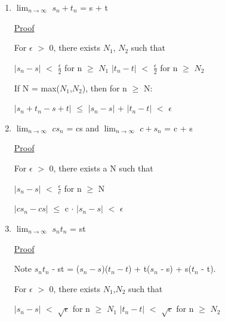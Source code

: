 	\begin{enumerate}[label=(\alph*), leftmargin=2cm, itemsep=0.1cm]
        \item $\lim_{n \rightarrow \infty}$ $s_n + t_n$ = s + t
        
            { \color{magenta} \underline{Proof} }

                For $\epsilon$ $>$ 0, there exists $N_1$, $N_2$ such that

                \hspace{1cm}
                $|s_n - s|$ $<$ $\frac{\epsilon}{2}$ for n $\geq$ $N_1$
                \hspace{1cm}
                $|t_n - t|$ $<$ $\frac{\epsilon}{2}$ for n $\geq$ $N_2$

                If N = max($N_1$,$N_2$), then for n $\geq$ N:

                \hspace{1cm}
                $|s_n+t_n - s+t|$ $\leq$ $|s_n - s|$ + $|t_n - t|$ $<$ $\epsilon$
        
        \item $\lim_{n \rightarrow \infty}$ $cs_n$ = cs and 
        $\lim_{n \rightarrow \infty}$ $c + s_n$ = c + s

            { \color{magenta} \underline{Proof} }

                For $\epsilon$ $>$ 0, there exists a N such that

                \hspace{1cm}
                $|s_n - s|$ $<$ $\frac{\epsilon}{c}$ for n $\geq$ N

                \hspace{1cm}
                $|cs_n - cs|$ $\leq$ c $\cdot$ $|s_n - s|$ $<$ $\epsilon$
        
        \item $\lim_{n \rightarrow \infty}$ $s_n t_n$ = st
        
            { \color{magenta} \underline{Proof} }

                Note $s_n t_n$ - st
                = ($s_n - s$)($t_n - t$) + t($s_n$ - s) + s($t_n$ - t).

                For $\epsilon$ $>$ 0, there exists $N_1$,$N_2$ such that

                \hspace{1cm}
                $|s_n - s|$ $<$ $\sqrt{\epsilon}$ for n $\geq$ $N_1$
                \hspace{1cm}
                $|t_n - t|$ $<$ $\sqrt{\epsilon}$ for n $\geq$ $N_2$


\end{enumerate}
